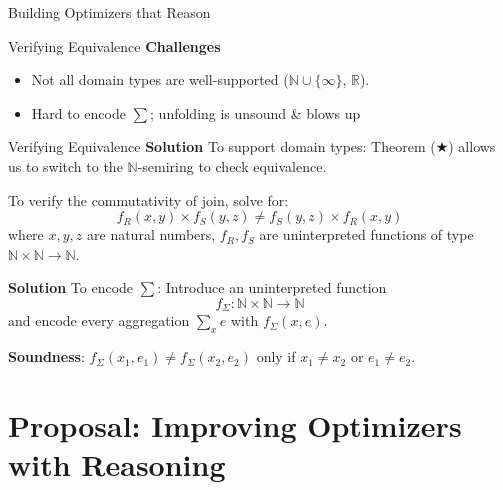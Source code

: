 \documentclass{beamer}
\newcommand{\N}{\mathbb N} %
\newcommand{\R}{\mathbb R} %
\newcommand{\set}[1]{\{#1\}}                    %
\begin{document}
  \begin{frame}{Building Optimizers that Reason}

  \end{frame}

  \begin{frame}{Verifying Equivalence}
    \textbf{Challenges}
    \begin{itemize}
      \item Not all domain types are well-supported ($\N \cup \set{\infty}$, $\R$).
      \item Hard to encode $\sum$; unfolding is unsound \& blows up
    \end{itemize}
  \end{frame}
  
  \begin{frame}{Verifying Equivalence}
    \textbf{Solution} To support domain types: Theorem ($\bigstar$) 
    allows us to switch to the $\N$-semiring to check equivalence. \pause
    
    To verify the commutativity of join, solve for: 
    \[f_R(x, y) \times f_S(y, z) \neq f_S(y, z) \times f_R(x, y)\]
    where $x, y, z$ are natural numbers, $f_R, f_S$ are uninterpreted
    functions of type $\N \times \N \rightarrow \N$. 
  \end{frame}

  \begin{frame}
    \textbf{Solution} To encode $\sum$: Introduce an uninterpreted function
    \[f_{\Sigma}:\N\times \N \rightarrow \N\] 
    and encode every aggregation $\sum_x e$ with $f_{\Sigma}(x, e)$. \pause

    \textbf{Soundness}: $f_{\Sigma}(x_1, e_1) \neq f_{\Sigma}(x_2, e_2)$ only
 if $x_1 \neq x_2$ or $e_1 \neq e_2$.
  \end{frame}

  \section{Proposal: Improving Optimizers with Reasoning}
\end{document}
